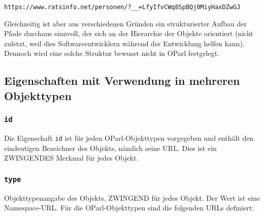 \documentclass[,a4paper]{article}
\begin{document}
\begin{verbatim}
https://www.ratsinfo.net/personen/?__=LfyIfvCWq8SpBQj0MiyHaxDZwGJ
\end{verbatim}

Gleichzeitig ist aber aus verschiedenen Gründen ein strukturierter
Aufbau der Pfade durchaus sinnvoll, der sich an der Hierarchie der
Objekte orientiert (nicht zuletzt, weil dies Softwareentwicklern während
der Entwicklung helfen kann). Dennoch wird eine solche Struktur bewusst
nicht in OParl festgelegt.

\subsection{Eigenschaften mit Verwendung in mehreren
Objekttypen}\label{eigenschaften-mit-verwendung-in-mehreren-objekttypen}

\subsubsection{\texttt{id}}\label{id}

Die Eigenschaft \texttt{id} ist für jeden OParl-Objekttypen vorgegeben
und enthält den eindeutigen Bezeichner des Objekts, nämlich seine URL.
Dies ist ein ZWINGENDES Merkmal für jedes Objekt.

\subsubsection{\texttt{type}}\label{type}

Objekttypenangabe des Objekts, ZWINGEND für jedes Objekt. Der Wert ist
eine Namespace-URL. Für die OParl-Objekttypen sind die folgenden URLs
definiert:
\end{document}
